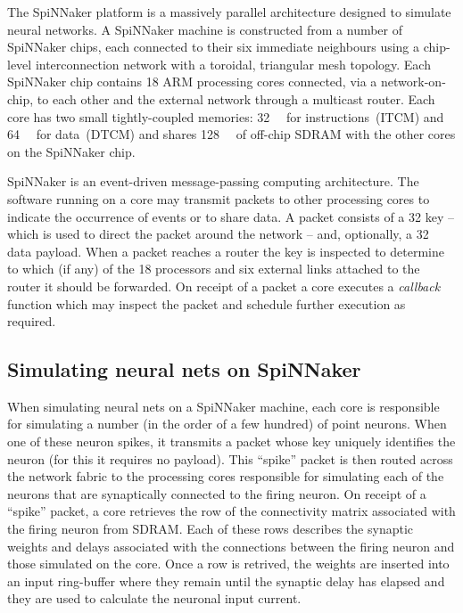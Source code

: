 \documentclass[conference]{IEEEtran}
\begin{document}
The SpiNNaker platform is a massively parallel architecture designed to simulate neural networks. A SpiNNaker machine is constructed from a number of SpiNNaker chips, each connected to their six immediate neighbours using a chip-level interconnection network with a toroidal, triangular mesh topology. Each SpiNNaker chip contains 18 ARM processing cores connected, via a network-on-chip, to each other and the external network through a multicast router. Each core has two small tightly-coupled memories: \SI{32}{\kibi\byte} for instructions~(ITCM) and \SI{64}{\kibi\byte} for data~(DTCM) and shares \SI{128}{\mebi\byte} of off-chip SDRAM with the other cores on the SpiNNaker chip.

SpiNNaker is an event-driven message-passing computing architecture. The software running on a core may transmit packets to other processing cores to indicate the occurrence of events or to share data. A packet consists of a \SI{32}{\bit} key -- which is used to direct the packet around the network -- and, optionally, a \SI{32}{\bit} data payload. When a packet reaches a router the key is inspected to determine to which (if any) of the 18 processors and six external links attached to the router it should be forwarded. On receipt of a packet a core executes a \textit{callback} function which may inspect the packet and schedule further execution as required.

  \subsection{Simulating neural nets on SpiNNaker}

When simulating neural nets on a SpiNNaker machine, each core is responsible for simulating a number (in the order of a few hundred) of point neurons. When one of these neuron spikes, it transmits a packet whose key uniquely identifies the neuron (for this it requires no payload). This ``spike'' packet is then routed across the network fabric to the processing cores responsible for simulating each of the neurons that are synaptically connected to the firing neuron. On receipt of a ``spike'' packet, a core retrieves the row of the connectivity matrix associated with the firing neuron from SDRAM. Each of these rows describes the synaptic weights and delays associated with the connections between the firing neuron and those simulated on the core. Once a row is retrived, the weights are inserted into an input ring-buffer where they remain until the synaptic delay has elapsed and they are used to calculate the neuronal input current.
\end{document}
